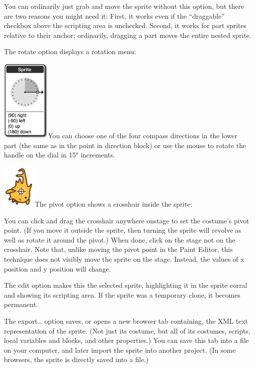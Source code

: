 You can ordinarily just grab and move the sprite without this option,
but there are two reasons you might need it: First, it works even if the
``draggable'' checkbox above the scripting area is unchecked. Second, it
works for part sprites relative to their anchor; ordinarily, dragging a
part moves the entire nested sprite.

The rotate option displays a rotation menu:

\includegraphics[width=0.93333in,height=1.58333in]{media/image1114.png}You
can choose one of the four compass directions in the lower part (the
same as in the point in direction block) or use the mouse to rotate the
handle on the dial in 15° increments.

\includegraphics[width=0.65278in,height=0.84722in]{media/image1115.png}The
pivot option shows a crosshair inside the sprite:

You can click and drag the crosshair anywhere onstage to set the
costume's pivot point. (If you move it outside the sprite, then turning
the sprite will revolve as well as rotate it around the pivot.) When
done, click on the stage not on the crosshair. Note that, unlike moving
the pivot point in the Paint Editor, this technique does not visibly
move the sprite on the stage. Instead, the values of x position and y
position will change.

The edit option makes this the selected sprite, highlighting it in the
sprite corral and showing its scripting area. If the sprite was a
temporary clone, it becomes permanent.

The export\ldots{} option saves, or opens a new browser tab containing,
the XML text representation of the sprite. (Not just its costume, but
all of its costumes, scripts, local variables and blocks, and other
properties.) You can save this tab into a file on your computer, and
later import the sprite into another project. (In some browsers, the
sprite is directly saved into a file.)

